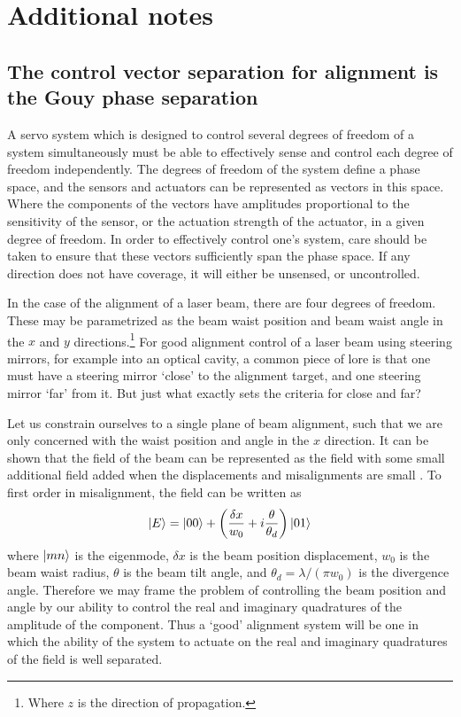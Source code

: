 \chapter{Additional notes}

\section{The control vector separation for alignment is the Gouy phase separation}
\label{sec:gouysep}
A servo system which is designed to control several degrees of freedom of a system simultaneously must be able to effectively sense and control each degree of freedom independently. %
The degrees of freedom of the system define a phase space, and the sensors and actuators can be represented as vectors in this space. %
Where the components of the vectors have amplitudes proportional to the sensitivity of the sensor, or the actuation strength of the actuator, in a given degree of freedom. %
In order to effectively control one's system, care should be taken to ensure that these vectors sufficiently span the phase space. %
If any direction does not have coverage, it will either be unsensed, or uncontrolled.

In the case of the alignment of a laser beam, there are four degrees of freedom. %
These may be parametrized as the beam waist position and beam waist angle in the $x$ and $y$ directions.\footnote{Where $z$ is the direction of propagation.} For good alignment control of a laser beam using steering mirrors, for example into an optical cavity, a common piece of lore is that one must have a steering mirror `close' to the alignment target, and one steering mirror `far' from it. %
But just what exactly sets the criteria for close and far?

Let us constrain ourselves to a single plane of beam alignment, such that we are only concerned with the waist position and angle in the $x$ direction. %
It can be shown that the field of the beam can be represented as the  field with some small additional  field added when the displacements and misalignments are small \cite{Anderson1984}. %
To first order in misalignment, the field can be written as
\begin{equation}
\label{eqn:shifttilt}
\left| E \right>=\left| 00 \right>+\left(\frac{\delta x}{w_0} + i \frac{\theta}{\theta_d}\right)\left| 01 \right>
\end{equation}
where $\left| mn \right>$ is the  eigenmode, $\delta x$ is the beam position displacement, $w_0$ is the beam waist radius, $\theta$ is the beam tilt angle, and $\theta_d=\lambda/(\pi w_0)$ is the divergence angle. %
Therefore we may frame the problem of controlling the beam position and angle by our ability to control the real and imaginary quadratures of the amplitude of the  component. %
Thus a `good' alignment system will be one in which the ability of the system to actuate on the real and imaginary quadratures of the  field is well separated.

